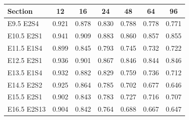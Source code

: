 \begin{tabular}{lcccccc}
\toprule
Section & 12 & 16 & 24 & 48 & 64 & 96 \\
\midrule
E9.5 E2S4 & 0.921 & 0.878 & 0.830 & 0.788 & 0.778 & 0.771 \\
E10.5 E2S1 & 0.941 & 0.909 & 0.883 & 0.860 & 0.857 & 0.855 \\
E11.5 E1S4 & 0.899 & 0.845 & 0.793 & 0.745 & 0.732 & 0.722 \\
E12.5 E2S1 & 0.936 & 0.901 & 0.867 & 0.846 & 0.844 & 0.846 \\
E13.5 E1S4 & 0.932 & 0.882 & 0.829 & 0.759 & 0.736 & 0.712 \\
E14.5 E2S2 & 0.925 & 0.864 & 0.785 & 0.702 & 0.677 & 0.646 \\
E15.5 E2S1 & 0.902 & 0.843 & 0.783 & 0.727 & 0.716 & 0.707 \\
E16.5 E2S13 & 0.904 & 0.842 & 0.764 & 0.688 & 0.667 & 0.647 \\
\bottomrule
\end{tabular}
